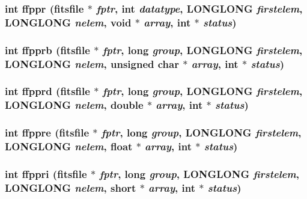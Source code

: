 \subsubsection{\setlength{\rightskip}{0pt plus 5cm}int ffppr (\bf{fitsfile} $\ast$ {\em fptr}, int {\em datatype}, \bf{LONGLONG} {\em firstelem}, \bf{LONGLONG} {\em nelem}, void $\ast$ {\em array}, int $\ast$ {\em status})}\label{fitsio__64_8h_f931a67d7160cdaf855057098337511f}


\subsubsection{\setlength{\rightskip}{0pt plus 5cm}int ffpprb (\bf{fitsfile} $\ast$ {\em fptr}, long {\em group}, \bf{LONGLONG} {\em firstelem}, \bf{LONGLONG} {\em nelem}, unsigned char $\ast$ {\em array}, int $\ast$ {\em status})}\label{fitsio__64_8h_edd9b7d590d4caaf22a5a02f2123e981}


\subsubsection{\setlength{\rightskip}{0pt plus 5cm}int ffpprd (\bf{fitsfile} $\ast$ {\em fptr}, long {\em group}, \bf{LONGLONG} {\em firstelem}, \bf{LONGLONG} {\em nelem}, double $\ast$ {\em array}, int $\ast$ {\em status})}\label{fitsio__64_8h_bcb9e32598b5c68125623cc6ad18adf5}


\subsubsection{\setlength{\rightskip}{0pt plus 5cm}int ffppre (\bf{fitsfile} $\ast$ {\em fptr}, long {\em group}, \bf{LONGLONG} {\em firstelem}, \bf{LONGLONG} {\em nelem}, float $\ast$ {\em array}, int $\ast$ {\em status})}\label{fitsio__64_8h_a7ad2029b3f043c3e909413184e5ce2f}


\subsubsection{\setlength{\rightskip}{0pt plus 5cm}int ffppri (\bf{fitsfile} $\ast$ {\em fptr}, long {\em group}, \bf{LONGLONG} {\em firstelem}, \bf{LONGLONG} {\em nelem}, short $\ast$ {\em array}, int $\ast$ {\em status})}\label{fitsio__64_8h_08d9b16056155823102497a507020ba4}


